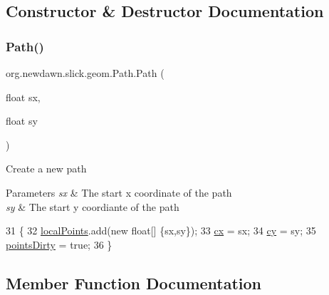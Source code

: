 \subsection{Constructor \& Destructor Documentation}
\mbox{\label{classorg_1_1newdawn_1_1slick_1_1geom_1_1_path_a5fef0f2e57590f14cccad52e87d5c0bb}} 
\subsubsection{\texorpdfstring{Path()}{Path()}}
{\footnotesize\ttfamily org.\+newdawn.\+slick.\+geom.\+Path.\+Path (\begin{DoxyParamCaption}\item[{float}]{sx,  }\item[{float}]{sy }\end{DoxyParamCaption})\hspace{0.3cm}{\ttfamily [inline]}}

Create a new path


\begin{DoxyParams}{Parameters}
{\em sx} & The start x coordinate of the path \\
\hline
{\em sy} & The start y coordiante of the path \\
\hline
\end{DoxyParams}

\begin{DoxyCode}
31                                     \{
32         \mbox{\hyperlink{classorg_1_1newdawn_1_1slick_1_1geom_1_1_path_af67630a074a387ccbe4ea8ad67e013d8}{localPoints}}.add(\textcolor{keyword}{new} \textcolor{keywordtype}{float}[] \{sx,sy\});
33         \mbox{\hyperlink{classorg_1_1newdawn_1_1slick_1_1geom_1_1_path_acbc8efe2abb56bf2aa33889ec35a2e3b}{cx}} = sx;
34         \mbox{\hyperlink{classorg_1_1newdawn_1_1slick_1_1geom_1_1_path_aecd6f6aaf8fd79b3acec8a24c2fd1a83}{cy}} = sy;
35         \mbox{\hyperlink{classorg_1_1newdawn_1_1slick_1_1geom_1_1_shape_a61fe1954d2fdefc72c34b284f4fcfdb4}{pointsDirty}} = \textcolor{keyword}{true};
36     \}
\end{DoxyCode}


\subsection{Member Function Documentation}
\mbox{\label{classorg_1_1newdawn_1_1slick_1_1geom_1_1_path_aa4171633209585dddcf46195c30e9bc9}} 
